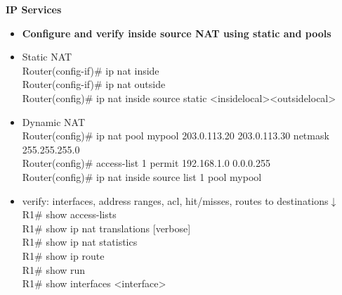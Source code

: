 \documentclass{article}
\begin{document}
\begin{flushleft}\textbf{IP Services}\end{flushleft}
\begin{itemize}
  \item \textbf{Configure and verify inside source NAT using static and pools}
  	\item[] Static NAT\\
		Router(config-if)\# ip nat inside\\
		Router(config-if)\# ip nat outside\\
		Router(config)\# ip nat inside source static \textless inside\-local\textgreater \textless outside\-local\textgreater
	\item[] Dynamic NAT\\
		Router(config)\# ip nat pool mypool 203.0.113.20 203.0.113.30 netmask 255.255.255.0\\
		Router(config)\# access-list 1 permit 192.168.1.0 0.0.0.255\\
		Router(config)\# ip nat inside source list 1 pool mypool\\
	\item[] verify: interfaces, address ranges, acl, hit/misses, routes to destinations$\downarrow$\\
		R1\# show access-lists\\
		R1\# show ip nat translations [verbose]\\
		R1\# show ip nat statistics\\
		R1\# show ip route\\
		R1\# show run\\
		R1\# show interfaces \textless interface\textgreater
		

\end{itemize}
\end{document}

